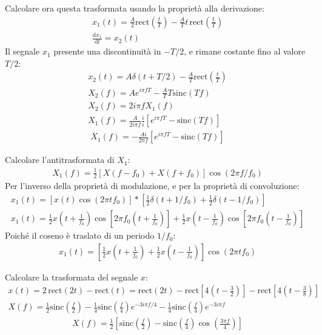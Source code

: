 \documentclass{article}
\newcommand{\rect}{\mathrm{rect}}
\newcommand{\sinc}{\mathrm{sinc}}
\newcommand{\df}{\mathrm{d}}
\begin{document}
Calcolare ora questa trasformata usando la proprietà alla derivazione:
\begin{gather*}
    x_1(t)=\displaystyle\frac{A}{2}\rect\left(\frac{t}{T}\right)-\frac{A}{T}t\,\rect\left(\frac{t}{T}\right)\\
    \displaystyle\frac{\df x_1}{\df t}=x_2(t)
\end{gather*}
Il segnale $x_1$ presente una discontinuità in $-T/2$, e rimane costante fino al valore $T/2$:
\begin{gather*}
    x_2(t)=A\delta(t+T/2)-\displaystyle\frac{A}{T}\rect\left(\frac{t}{T}\right)\\
    X_2(f)=Ae^{i\pi fT}-\displaystyle\frac{A}{T}T\sinc(Tf)\\
    X_2(f)=2i\pi fX_1(f)\\
    X_1(f)=\displaystyle\frac{A}{2i\pi f}\frac{i}{i}\left[e^{i\pi fT}-\sinc(Tf)\right]
\end{gather*}
\begin{gather}
    X_1(f)=\displaystyle-\frac{Ai}{2\pi f}\left[e^{i\pi fT}-\sinc(Tf)\right]
\end{gather}


Calcolare l'antitrasformata di $X_1$:
\begin{gather*}
    X_1(f)=\displaystyle\frac{1}{2}\left[X(f-f_0)+X(f+f_0)\right]\cos(2\pi f/f_0)
\end{gather*}
Per l'inverso della proprietà di modulazione, e per la proprietà di convoluzione:
\begin{gather*}
    x_1(t)=\left[x(t)\cos(2\pi tf_0)\right]*\left[\displaystyle\frac{1}{2}\delta(t+1/f_0)+\frac{1}{2}\delta(t-1/f_0)\right]\\
    x_1(t)=\displaystyle\frac{1}{2}x\left(t+\frac{1}{f_0}\right)\cos\left[2\pi f_0\left(t+\frac{1}{f_0}\right)\right]+\frac{1}{2}x\left(t-\frac{1}{f_0}\right)\cos\left[2\pi f_0\left(t-\frac{1}{f_0}\right)\right]
\end{gather*}
Poiché il coseno è traslato di un periodo $1/f_0$: 
\begin{gather}
    x_1(t)=\left[\displaystyle\frac{1}{2}x\left(t+\frac{1}{f_0}\right)+\frac{1}{2}x\left(t-\frac{1}{f_0}\right)\right]\cos(2\pi tf_0)
\end{gather}


Calcolare la trasformata del segnale $x$:
\begin{gather*}
    x(t)=2\,\rect(2t)-\rect(t)=\rect(2t)-\rect\left[\displaystyle4\left(t-\frac{3}{2}\right)\right]-\rect\left[\displaystyle4\left(t-\frac{3}{8}\right)\right]\\
    X(f)=\displaystyle\frac{1}{2}\sinc\left(\frac{f}{2}\right)-\frac{1}{4}\sinc\left(\frac{f}{4}\right)e^{-3i\pi f/4}-\frac{1}{4}\sinc\left(\frac{f}{4}\right)e^{-3i\pi f}
\end{gather*}
\begin{gather}
    X(f)=\displaystyle\frac{1}{2}\left[\sinc\left(\frac{f}{2}\right)-\sinc\left(\frac{f}{4}\right)\cos\left(\frac{3\pi f}{4}\right)\right]
\end{gather}
\end{document}
